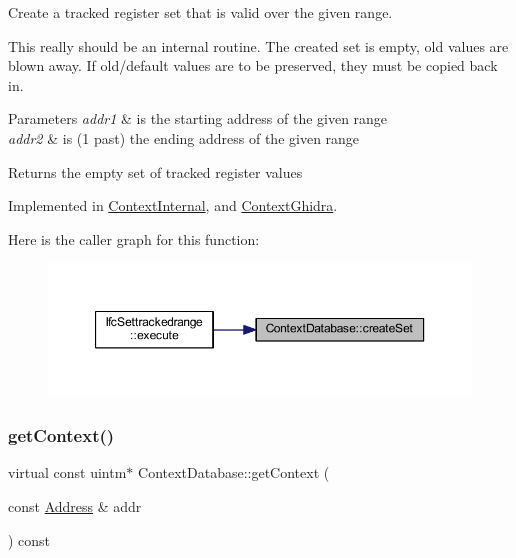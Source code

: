 Create a tracked register set that is valid over the given range. 

This really should be an internal routine. The created set is empty, old values are blown away. If old/default values are to be preserved, they must be copied back in. 
\begin{DoxyParams}{Parameters}
{\em addr1} & is the starting address of the given range \\
\hline
{\em addr2} & is (1 past) the ending address of the given range \\
\hline
\end{DoxyParams}
\begin{DoxyReturn}{Returns}
the empty set of tracked register values 
\end{DoxyReturn}


Implemented in \mbox{\hyperlink{class_context_internal_aa3e2cdba48dac0da0a63c023b96fd07a}{Context\+Internal}}, and \mbox{\hyperlink{class_context_ghidra_ab7f9df57870baceb7776fd8dcdbd5287}{Context\+Ghidra}}.

Here is the caller graph for this function\+:
\nopagebreak
\begin{figure}[H]
\begin{center}
\leavevmode
\includegraphics[width=350pt]{class_context_database_aba61e2244e4c12105ed5b45a47720808_icgraph}
\end{center}
\end{figure}
\mbox{\label{class_context_database_a780d39f9c8f7bafe9bbb7eb948d3f9ca}} 
\subsubsection{\texorpdfstring{getContext()}{getContext()}\hspace{0.1cm}{\footnotesize\ttfamily [1/2]}}
{\footnotesize\ttfamily virtual const uintm$\ast$ Context\+Database\+::get\+Context (\begin{DoxyParamCaption}\item[{const \mbox{\hyperlink{class_address}{Address}} \&}]{addr }\end{DoxyParamCaption}) const\hspace{0.3cm}{\ttfamily [pure virtual]}}



